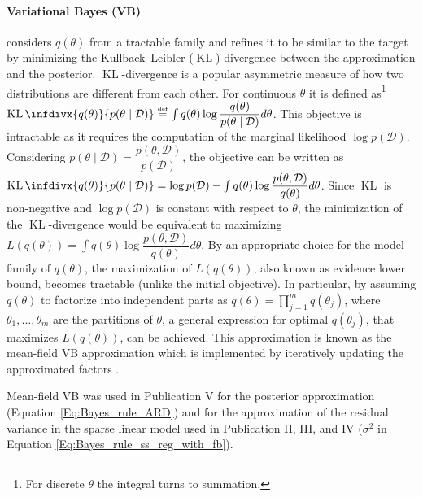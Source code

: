 \documentclass[dissertation,math,vertlayout,pdfa,colorlinks]{aaltoseries}
\newcommand{\bD}{\mathcal{D}}
\DeclareMathOperator{\KLt}{KL}
\newcommand{\KL}{\KLt\infdivx}
\begin{document}
\paragraph{Variational Bayes (VB)} \cite{Blei_VB} considers $q(\theta)$ from a tractable family and refines it to be similar to the target by minimizing the Kullback–Leibler ($\KLt$) divergence between the approximation and the posterior. $\KLt$-divergence is a popular asymmetric measure of how two distributions are different from each other. For continuous $\theta$ it is defined as\footnote{For discrete $\theta$ the integral turns to summation.} $\KL{q(\theta)}{p(\theta \mid \bD)} \overset{\underset{\mathrm{def}}{}}{=} \int q(\theta) \log\dfrac{q(\theta)}{p(\theta \mid \bD)} d\theta$. This objective is intractable as it requires the computation of the marginal likelihood $\log p(\bD)$. Considering $p(\theta \mid \bD)= \dfrac{p(\theta, \bD)}{p(\bD)}$, the objective can be written as $\KL{q(\theta)}{p(\theta \mid \bD)} = \log p(\bD) - \int q(\theta) \log\dfrac{p(\theta, \bD)}{q(\theta)} d\theta $. Since $\KLt$ is non-negative and $\log p(\bD)$ is constant with respect to $\theta$, the minimization of the $\KLt$-divergence would be equivalent to maximizing $L(q(\theta)) = \int q(\theta) \log\dfrac{p(\theta, \bD)}{q(\theta)} d\theta$. By an appropriate choice for the model family of $q(\theta)$, the maximization of $L(q(\theta))$, also known as evidence lower bound, becomes tractable (unlike the initial objective). In particular, by assuming $q(\theta)$ to factorize into independent parts as $q(\theta) = \prod_{j=1}^{m}q(\theta_j)$, where $\theta_1,\ldots,\theta_m$ are the partitions of $\theta$, 
a general expression for optimal $q(\theta_j)$, that maximizes $L(q(\theta))$, can be achieved. This approximation is known as the mean-field VB approximation which is implemented by iteratively updating the approximated factors \cite[Chapter~10]{bishop2006pattern}.  
	
Mean-field VB was used in Publication V for the posterior approximation (Equation \ref{Eq:Bayes_rule_ARD}) and for the approximation of the residual variance in the sparse linear model used in Publication II, III, and IV ($\sigma^2$ in Equation \ref{Eq:Bayes_rule_ss_reg_with_fb}).
	
	
\end{document}
